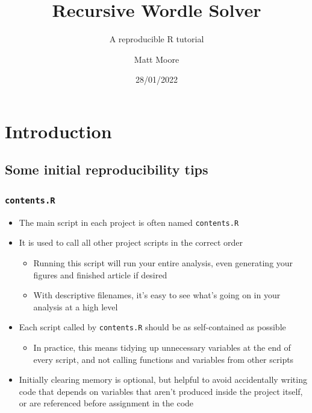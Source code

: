 \documentclass[
]{article}
\title{Recursive Wordle Solver}
\subtitle{A reproducible R tutorial}
\author{Matt Moore}
\date{28/01/2022}
\providecommand{\tightlist}{%
  \setlength{\itemsep}{0pt}\setlength{\parskip}{0pt}}
\begin{document}
\maketitle

\hypertarget{introduction}{%
\section{Introduction}\label{introduction}}

\hypertarget{some-initial-reproducibility-tips}{%
\subsection{Some initial reproducibility
tips}\label{some-initial-reproducibility-tips}}

\hypertarget{contents.r}{%
\subsubsection{\texorpdfstring{\texttt{contents.R}}{contents.R}}\label{contents.r}}

\begin{itemize}
\item
  The main script in each project is often named \texttt{contents.R}
\item
  It is used to call all other project scripts in the correct order

  \begin{itemize}
  \item
    Running this script will run your entire analysis, even generating
    your figures and finished article if desired
  \item
    With descriptive filenames, it's easy to see what's going on in your
    analysis at a high level
  \end{itemize}
\item
  Each script called by \texttt{contents.R} should be as self-contained
  as possible

  \begin{itemize}
  \tightlist
  \item
    In practice, this means tidying up unnecessary variables at the end
    of every script, and not calling functions and variables from other
    scripts
  \end{itemize}
\item
  Initially clearing memory is optional, but helpful to avoid
  accidentally writing code that depends on variables that aren't
  produced inside the project itself, or are referenced before
  assignment in the code
\end{itemize}
\end{document}
